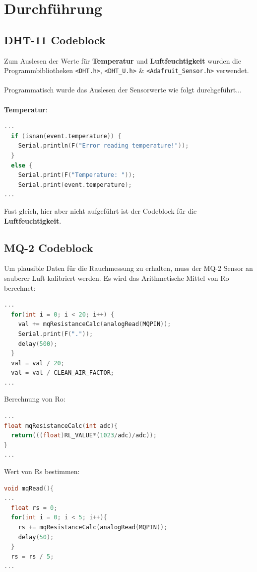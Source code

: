 \documentclass[a4paper, 11pt]{article}
\begin{document}
\newpage
\section{Durchführung}
\subsection{DHT-11 Codeblock}
Zum Auslesen der Werte für \textbf{Temperatur} und \textbf{Luftfeuchtigkeit}
wurden die Programmbibliotheken \texttt{<DHT.h>}, \texttt{<DHT\_U.h>} \&
\texttt{<Adafruit\_Sensor.h>} verwendet.
\\\\
Programmatisch wurde das Auslesen der Sensorwerte wie folgt durchgeführt...
\\\\
\textbf{Temperatur}:
\begin{lstlisting}[language=C, style=code]
...
  if (isnan(event.temperature)) {
    Serial.println(F("Error reading temperature!"));
  }
  else {
    Serial.print(F("Temperature: "));
    Serial.print(event.temperature);
...
\end{lstlisting}
Fast gleich, hier aber nicht aufgeführt ist der Codeblock für die 
\textbf{Luftfeuchtigkeit}.

\subsection{MQ-2 Codeblock}

Um plausible Daten für die Rauchmessung zu erhalten, muss der MQ-2 Sensor
an sauberer Luft kalibriert werden. Es wird das Arithmetische Mittel von Ro
berechnet:

\begin{lstlisting}[language=C, style=code]
...
  for(int i = 0; i < 20; i++) {
    val += mqResistanceCalc(analogRead(MQPIN));
    Serial.print(F("."));
    delay(500);
  }
  val = val / 20;
  val = val / CLEAN_AIR_FACTOR;
...
\end{lstlisting}

Berechnung von Ro:

\begin{lstlisting}[language=C, style=code]
...
float mqResistanceCalc(int adc){
  return(((float)RL_VALUE*(1023/adc)/adc));
}
...
\end{lstlisting}
\newpage
Wert von Rs bestimmen:

\begin{lstlisting}[language=C, style=code]
void mqRead(){
...
  float rs = 0;
  for(int i = 0; i < 5; i++){ 
    rs += mqResistanceCalc(analogRead(MQPIN));
    delay(50);
  }
  rs = rs / 5;
...
\end{lstlisting}
\end{document}
